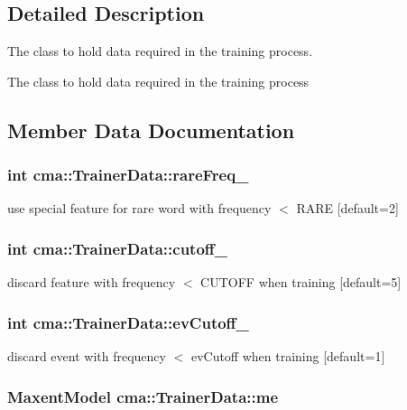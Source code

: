 \subsection{Detailed Description}
The class to hold data required in the training process. 

The class to hold data required in the training process 

\subsection{Member Data Documentation}
\subsubsection{\setlength{\rightskip}{0pt plus 5cm}int {\bf cma::TrainerData::rareFreq\_\-}}\label{classcma_1_1TrainerData_c13b7242d3736c2d40772d093fc91a18}


use special feature for rare word with frequency $<$ RARE [default=2] 
\subsubsection{\setlength{\rightskip}{0pt plus 5cm}int {\bf cma::TrainerData::cutoff\_\-}}\label{classcma_1_1TrainerData_23c70e451c8ba9cf53e2eccec8fc421d}


discard feature with frequency $<$ CUTOFF when training [default=5] 
\subsubsection{\setlength{\rightskip}{0pt plus 5cm}int {\bf cma::TrainerData::evCutoff\_\-}}\label{classcma_1_1TrainerData_22eca27d2b88fc89251ed74fa9b1a255}


discard event with frequency $<$ evCutoff when training [default=1] 
\subsubsection{\setlength{\rightskip}{0pt plus 5cm}MaxentModel {\bf cma::TrainerData::me}}\label{classcma_1_1TrainerData_eebdd898115e74ed985c5b776bbb3074}


